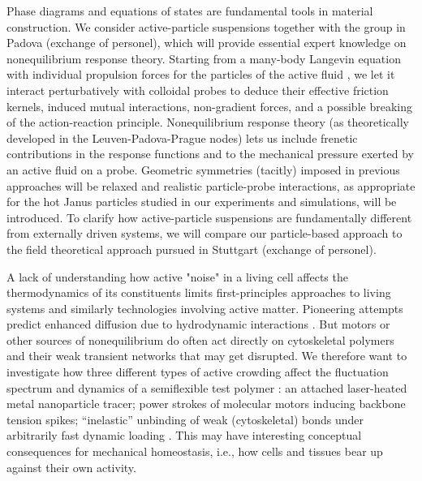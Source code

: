 \begin{workpackage}[id=WPactive,wphases=0-48,
  short=Active Particle Suspensions,%
  title=Probing active particle suspensions with colloids and polymers,
  lead=ULEI,
  ULEIRM=96,UNIPDRM=6,USTUTTRM=2]
\begin{tasklist}

\begin{task}[title=Nonequilibrium equations of state (NEOS),id=task1,PM=8,lead=ULEI,partners={UNIPD,USTUTT},
wphases=0-48!0.5]
Phase diagrams and equations of states are fundamental tools in material construction.
We consider active-particle suspensions together with the group in Padova (exchange of personel), 
which will provide essential expert knowledge on nonequilibrium response theory.
%
Starting from a many-body Langevin equation with individual propulsion forces for the
particles of the active fluid \cite{solon-etal:2015}, we let it interact perturbatively with colloidal probes to
deduce their effective friction kernels, induced mutual interactions, non-gradient forces, and a possible breaking of
the action-reaction principle.  
%
Nonequilibrium response theory (as theoretically developed in the Leuven-Padova-Prague nodes) lets us include 
frenetic contributions in the response functions \cite{baiesi-wynants:2009} and to the mechanical pressure 
exerted by an active fluid on a probe. 
%
Geometric symmetries (tacitly) imposed in previous approaches will be relaxed and realistic particle-probe interactions, 
as appropriate for the hot Janus particles studied in our experiments and simulations, will be introduced.
%
To clarify how active-particle suspensions are fundamentally different from externally driven systems,
we will compare our particle-based approach to the field theoretical approach pursued in Stuttgart (exchange of personel). 

\end{task}

\begin{task}[title=Active Crowding,id=task2,lead=ULEI,partners={KUL},wphases=0-48!0.5]
A lack of understanding how active "noise" in a living cell affects the thermodynamics
of its constituents limits first-principles approaches to living systems and 
similarly technologies involving active matter.
Pioneering attempts predict enhanced diffusion due to hydrodynamic interactions \cite{mikhailov-kapral:2015}.
%
But motors or other sources of nonequilibrium do often act directly on cytoskeletal 
polymers and their weak transient networks that may get disrupted. We therefore want to investigate 
how three different types of active crowding affect the fluctuation spectrum and dynamics of a 
semiflexible test polymer \cite{otto-etal:2013}:
an attached laser-heated metal nanoparticle tracer; power strokes of molecular
motors inducing backbone tension spikes; ``inelastic''  \cite{gralka-kroy:2015}
unbinding of weak (cytoskeletal) bonds under arbitrarily fast dynamic loading \cite{bullerjahn-sturm-kroy:2014}.
%
This may have interesting conceptual consequences for mechanical homeostasis, i.e., how cells and tissues bear up against 
their own activity.   


\end{task}
\end{tasklist}
\end{workpackage}
